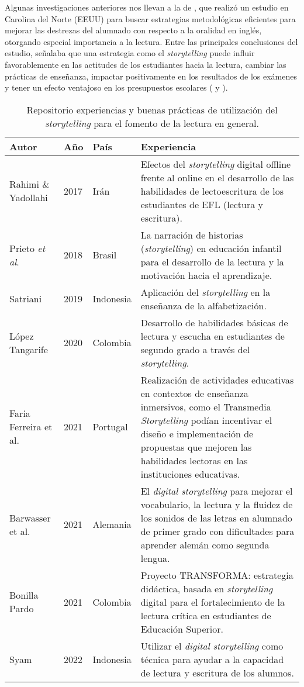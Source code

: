 \documentclass[spanish]{textolivre}
\begin{document}
Algunas investigaciones anteriores nos llevan a la de \textcite{gomez_palacio_strategies_2010}, que realizó un estudio en Carolina del Norte (EEUU) para buscar estrategias metodológicas eficientes para mejorar las destrezas del alumnado con respecto a la oralidad en inglés, otorgando especial importancia a la lectura. Entre las principales conclusiones del estudio, señalaba que una estrategia como el \textit{storytelling} puede influir favorablemente en las actitudes de los estudiantes hacia la lectura, cambiar las prácticas de enseñanza, impactar positivamente en los resultados de los exámenes y tener un efecto ventajoso en los presupuestos escolares ( y ). 

\begin{table}[h!]
\begin{threeparttable}
\caption{Repositorio experiencias y buenas prácticas de utilización del \textit{storytelling} para el fomento de la lectura en general.}
\label{tab01}
\centering
\begin{tabular}{p{} p{1cm} p{2cm} p{7cm}}
\toprule 
\textbf{Autor} & \textbf{Año} & \textbf{País} & \textbf{Experiencia} \\
\midrule
Rahimi \& Yadollahi & 2017 & Irán & Efectos del \textit{storytelling} digital offline frente al online en el desarrollo de las habilidades de lectoescritura de los estudiantes de EFL (lectura y escritura). \\
Prieto \textit{et al}. & 2018 & Brasil & La narración de historias (\textit{storytelling}) en educación infantil para el desarrollo de la lectura y la motivación hacia el aprendizaje. \\
Satriani & 2019 & Indonesia & Aplicación del \textit{storytelling} en la enseñanza de la alfabetización. \\
López Tangarife & 2020 & Colombia & Desarrollo de habilidades básicas de lectura y escucha en estudiantes de segundo grado a través del \textit{storytelling}. \\
Faria Ferreira et al. & 2021 & Portugal & Realización de actividades educativas en contextos de enseñanza inmersivos, como el Transmedia \textit{Storytelling} podían incentivar el diseño e implementación de propuestas que mejoren las habilidades lectoras en las instituciones educativas. \\
Barwasser et al. & 2021 & Alemania & El \textit{digital storytelling} para mejorar el vocabulario, la lectura y la fluidez de los sonidos de las letras en alumnado de primer grado con dificultades para aprender alemán como segunda lengua. \\
Bonilla Pardo & 2021 & Colombia & Proyecto TRANSFORMA: estrategia didáctica, basada en \textit{storytelling} digital para el fortalecimiento de la lectura crítica en estudiantes de Educación Superior. \\
Syam & 2022 & Indonesia & Utilizar el \textit{digital storytelling} como técnica para ayudar a la capacidad de lectura y escritura de los alumnos. \\
\bottomrule
\end{tabular}
\end{threeparttable}
\end{table}
\end{document}
